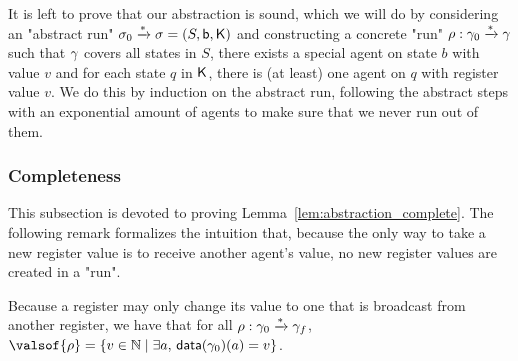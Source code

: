
It is left to prove that our abstraction is sound, which we will do by considering an "abstract run" $\sigma_0 \xrightarrow{\ast} \sigma = (S, \mathsf{b}, \mathsf{K})$ and constructing a concrete "run" $\rho : \gamma_0 \xrightarrow{\ast} \gamma $ such that $\gamma$ covers all states in $S$, there exists a special agent on state $b$ with value $v$ and for each state $q$ in $\mathsf{K}$, there is (at least) one agent on $q$ with register value $v$. We do this by induction on the abstract run, following the abstract steps with an exponential amount of agents to make sure that we never run out of them.



\subsubsection{Completeness}
\label{one-completeness}

This subsection is devoted to proving Lemma~\ref{lem:abstraction_complete}.
The following remark formalizes the intuition that, because the only way to take a new register value is to receive another agent's value, no new register values are created in a "run".
\begin{remark}
	\label{rem:run_no_new_register_values}
	Because a register may only change its value to one that is broadcast from another register, we have that for all $\rho: \gamma_0 \xrightarrow{*} \gamma_f$, $\valsof{\run} = \set{\aval \in \nats \mid \exists a, \, \data{\config_0}(a) = \aval}$.
\end{remark}



